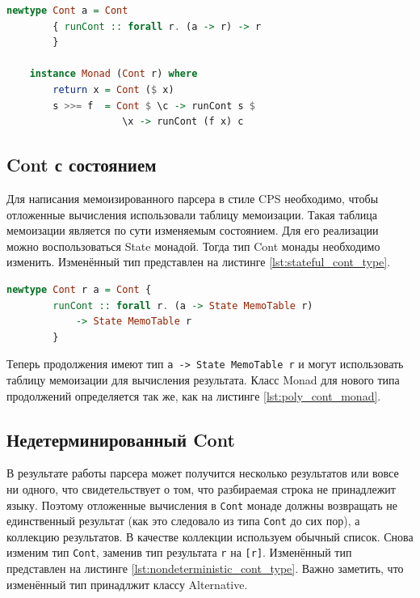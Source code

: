 \documentclass[times]{itmo-student-thesis}
\begin{document}
\begin{lstlisting}[language=Haskell,float=!h,caption={Монада Cont полиморфная по результату},label={lst:poly_cont_monad}]
    newtype Cont a = Cont
        { runCont :: forall r. (a -> r) -> r
        }

    instance Monad (Cont r) where
        return x = Cont ($ x)
        s >>= f  = Cont $ \c -> runCont s $ 
                    \x -> runCont (f x) c
\end{lstlisting}

\subsection{Cont с состоянием}\label{sec:stateful_cont}

Для написания мемоизированного парсера в стиле CPS необходимо, чтобы отложенные вычисления использовали таблицу мемоизации. 
Такая таблица мемоизации является по сути изменяемым состоянием. Для его реализации можно воспользоваться State монадой.
Тогда тип Cont монады необходимо изменить. Изменённый тип представлен на листинге \ref{lst:stateful_cont_type}.

\begin{lstlisting}[language=Haskell,float=!h,caption={Тип Cont с состоянием},label={lst:stateful_cont_type}]
    newtype Cont r a = Cont { 
        runCont :: forall r. (a -> State MemoTable r) 
            -> State MemoTable r 
        }
\end{lstlisting}

Теперь продолжения имеют тип \lstinline{a -> State MemoTable r} и могут использовать таблицу мемоизации для вычисления результата.
Класс Monad для нового типа продолжений определяется так же, как на листинге \ref{lst:poly_cont_monad}.

\subsection{Недетерминированный Cont}\label{sec:contt_transformer}

В результате работы парсера может получится несколько результатов или вовсе ни одного, что свидетельствует о том, что 
разбираемая строка не принадлежит языку. Поэтому отложенные вычисления в \lstinline{Cont} монаде должны возвращать не 
единственный результат (как это следовало из типа \lstinline{Cont} до сих пор), а коллекцию результатов. В качестве коллекции используем обычный список.
Снова изменим тип \lstinline{Cont}, заменив тип результата \lstinline{r} на \lstinline{[r]}. Изменённый тип представлен на листинге \ref{lst:nondeterministic_cont_type}.
Важно заметить, что изменённый тип принадлжит классу Alternative.
\end{document}
